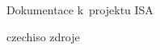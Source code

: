 \documentclass[a4paper,11pt]{article}
\begin{document}
\begin{center}
  \Huge
  Dokumentace k~projektu ISA\\
\end{center}


\cite{RFC2080}
\renewcommand{\refname}{Bibliografie}
 {czechiso}
 {zdroje}
\end{document}

